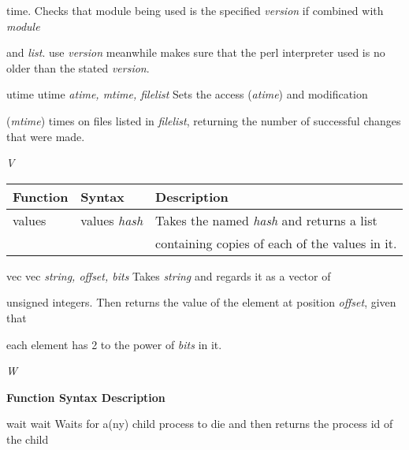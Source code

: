 \documentclass[a4paper,11pt]{book}
\begin{document}
\noindent time. Checks that module being used is the specified \textit{version }if combined with \textit{module}

\noindent and \textit{list}. use \textit{version }meanwhile makes sure that the perl interpreter used is no older than the stated \textit{version}.

\noindent 

\noindent 

\noindent 

\noindent utime utime \textit{atime, mtime, filelist }Sets the access (\textit{atime}) and modification

\noindent (\textit{mtime}) times on files listed in \textit{filelist}, returning the number of successful changes that were made.

\noindent 

\noindent 

\noindent 

\noindent \textit{V}

\begin{tabular}{|p{0.9in}|p{1.1in}|p{2.2in}|} \hline 
\textbf{Function} & \textbf{Syntax} & \textbf{Description} \\ \hline 
values & values \textit{hash} & Takes the named \textit{hash }and returns a list \\ \hline 
 &  & containing copies of each of the values in it. \\ \hline 
\end{tabular}



\noindent 

\noindent 

\noindent vec vec \textit{string, offset, bits }Takes \textit{string }and regards it as a vector of

\noindent unsigned integers. Then returns the value of the element at position \textit{offset}, given that

\noindent each element has 2 to the power of \textit{bits }in it.

\noindent 

\noindent 

\noindent 

\noindent \textit{W}

\noindent 

\noindent \textbf{Function Syntax Description}

\noindent 

\noindent wait wait Waits for a(ny) child process to die and then returns the process id of the child
\end{document}
